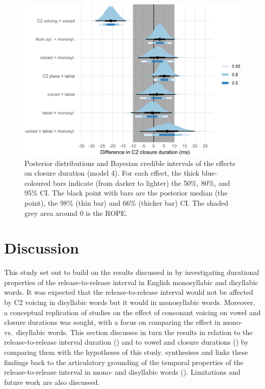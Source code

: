 \documentclass[
  12pt,
  a4paper,
]{article}
\begin{document}
\begin{figure}
\includegraphics[width=\linewidth]{2019-english-rr_files/figure-latex/clos-5-intervals-1} \caption{Posterior distributions and Bayesian credible intervals of the effects on closure duration (model 4). For each effect, the thick blue-coloured bars indicate (from darker to lighter) the 50\%, 80\%, and 95\% CI. The black point with bars are the posterior median (the point), the 98\% (thin bar) and 66\% (thicker bar) CI. The shaded grey area around 0 is the ROPE.}\label{f:clos-5-intervals}
\end{figure}

\hypertarget{discussion}{%
\section{Discussion}\label{discussion}}

This study set out to build on the results discussed in
\citet{coretta2018j} by investigating durational properties of the
release-to-release interval in English monosyllabic and disyllabic
words. It was expected that the release-to-release interval would not be
affected by C2 voicing in disyllabic words but it would in monosyllabic
words. Moreover, a conceptual replication of studies on the effect of
consonant voicing on vowel and closure durations was sought, with a
focus on comparing the effect in mono- vs.~disyllabic words. This
section discusses in turn the results in relation to the
release-to-release interval duration () and to vowel and
closure durations () by comparing them with the
hypotheses of this study.  synthesises and links these
findings back to the articulatory grounding of the temporal properties
of the release-to-release interval in mono- and disyllabic words
(). Limitations and future work are also discussed.
\end{document}
